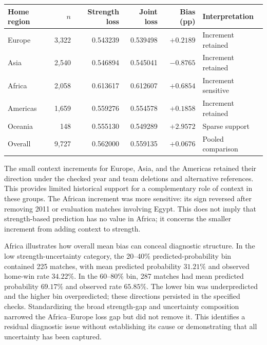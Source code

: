 \begin{table}[htbp]
\centering\small
{}
\label{tab:regional-diagnostics}
\begin{tabular}{lrrrrp{3.4cm}}
\toprule
Home region & $n$ & Strength loss & Joint loss & Bias (pp) & Interpretation \\
\midrule
Europe & 3,322 & 0.543239 & 0.539498 & $+0.2189$ & Increment retained \\
Asia & 2,540 & 0.546894 & 0.545041 & $-0.8765$ & Increment retained \\
Africa & 2,058 & 0.613617 & 0.612607 & $+0.6854$ & Increment sensitive \\
Americas & 1,659 & 0.559276 & 0.554578 & $+0.1858$ & Increment retained \\
Oceania & 148 & 0.555130 & 0.549289 & $+2.9572$ & Sparse support \\
Overall & 9,727 & 0.562000 & 0.559135 & $+0.0676$ & Pooled comparison \\
\bottomrule
\end{tabular}
\end{table}

The small context increments for Europe, Asia, and the Americas retained their direction under the checked year and team deletions and alternative references. This provides limited historical support for a complementary role of context in these groups. The African increment was more sensitive: its sign reversed after removing 2011 or evaluation matches involving Egypt. This does not imply that strength-based prediction has no value in Africa; it concerns the smaller increment from adding context to strength.

Africa illustrates how overall mean bias can conceal diagnostic structure. In the low strength-uncertainty category, the 20--40\% predicted-probability bin contained 225 matches, with mean predicted probability $31.21\%$ and observed home-win rate $34.22\%$. In the 60--80\% bin, 287 matches had mean predicted probability $69.17\%$ and observed rate $65.85\%$. The lower bin was underpredicted and the higher bin overpredicted; these directions persisted in the specified checks. Standardizing the broad strength-gap and uncertainty composition narrowed the Africa--Europe loss gap but did not remove it. This identifies a residual diagnostic issue without establishing its cause or demonstrating that all uncertainty has been captured.

